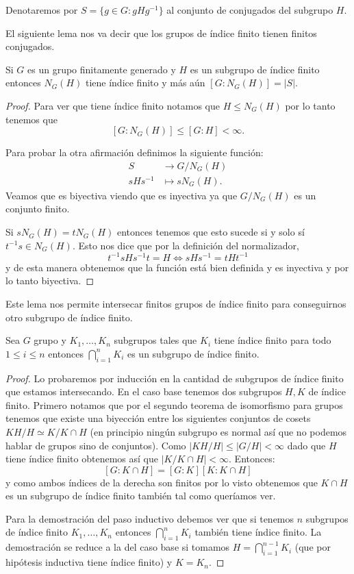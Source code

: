 \documentclass[tesis.tex]{subfiles}
\begin{document}
Denotaremos por $S= \{ g \in G :  gHg^{-1} \}$ al conjunto de conjugados del subgrupo $H$. 

El siguiente lema nos va decir que los grupos de índice finito tienen finitos conjugados.

\begin{lema}\label{lema_normalizador_conjugados}
	Si $G$ es un grupo finitamente generado y $H$ es un subgrupo de índice finito entonces $N_G(H)$ tiene índice finito y más aún $[G:N_G(H)] = |S|$.
\end{lema}
\begin{proof}
	Para ver que tiene índice finito notamos que $H \le N_G(H)$ por lo tanto tenemos que 
	\[
	[G:N_G(H)] \le [G:H] < \infty.
	\]
	
	Para probar la otra afirmación definimos la siguiente función:
	\begin{align*}
		S  &\to  G/N_G(H)  \\
		sHs^{-1} &\mapsto sN_G(H).
	\end{align*}
	Veamos que es biyectiva viendo que es inyectiva ya que $G/N_{G}(H)$ es un conjunto finito.
	
	Si $sN_G(H) = tN_G(H)$ entonces tenemos que esto sucede si y solo sí $t^{-1}s \in N_G(H)$.
	Esto nos dice que por la definición del normalizador,
	\[
	t^{-1}s H s^{-1}t = H \iff sHs^{-1} = tHt^{-1}
	\]
	y de esta manera obtenemos que la función está bien definida y es inyectiva y por lo tanto biyectiva.
	
\end{proof}

Este lema nos permite intersecar finitos grupos de índice finito para conseguirnos otro subgrupo de índice finito. 


\begin{lema}\label{lema_indice_interseccion}
	Sea $G$ grupo y $K_1, \dots, K_n$ subgrupos tales que $K_{i}$ tiene índice finito para todo $ 1 \le i \le n $ entonces $\bigcap_{i=1}^{n} K_{i}$ es un subgrupo de índice finito.
\end{lema}
\begin{proof}
	Lo probaremos por inducción en la cantidad de subgrupos de índice finito que estamos intersecando.
	En el caso base tenemos dos subgrupos $H,K$ de índice finito.
	Primero notamos que por el segundo teorema de isomorfismo para grupos tenemos que existe una biyección entre los siguientes conjuntos de cosets $ KH / H \simeq K / K \cap H $ (en principio ningún subgrupo es normal así que no podemos hablar de grupos sino de conjuntos).
	Como  $|KH / H| \le |G / H| < \infty$ dado que $H$ tiene índice finito obtenemos así que $|K / K \cap H| < \infty$.
	Entonces:
	\[
	[G:K\cap H] = [G:K][K: K \cap H]
	\]
	y como ambos índices de la derecha son finitos por lo visto obtenemos que $K \cap H$ es un subgrupo de índice finito también tal como queríamos ver.
	
	Para la demostración del paso inductivo debemos ver que si tenemos $n$ subgrupos de índice finito $K_{1}, \dots, K_{n}$ entonces $\bigcap_{i=1}^{n} K_{i}$ también tiene índice finito.
	La demostración se reduce a la del caso base si tomamos $H = \bigcap_{i=1}^{n-1} K_{i}$ (que por hipótesis inductiva tiene índice finito) y $K = K_{n}$.
\end{proof}
\end{document}
